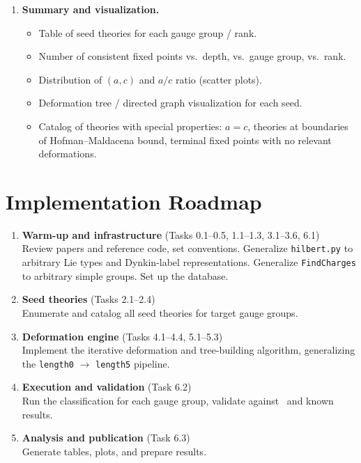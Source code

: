 \documentclass[12pt]{article}
\begin{document}
\begin{enumerate}[label=\textbf{6.\arabic*}]
\item \textbf{Summary and visualization.} \\
  \begin{itemize}
    \item Table of seed theories for each gauge group / rank.
    \item Number of consistent fixed points vs.\ depth, vs.\ gauge group, vs.\ rank.
    \item Distribution of $(a, c)$ and $a/c$ ratio (scatter plots).
    \item Deformation tree / directed graph visualization for each seed.
    \item Catalog of theories with special properties: $a = c$, theories at boundaries of Hofman--Maldacena bound, terminal fixed points with no relevant deformations.
  \end{itemize}

\end{enumerate}

\section{Implementation Roadmap}

\begin{enumerate}[label=\textbf{Phase \arabic*:}]

\item \textbf{Warm-up and infrastructure} (Tasks 0.1--0.5, 1.1--1.3, 3.1--3.6, 6.1) \\
  Review papers and reference code, set conventions.
  Generalize \texttt{hilbert.py} to arbitrary Lie types and Dynkin-label representations.
  Generalize \texttt{FindCharges} to arbitrary simple groups.
  Set up the database.

\item \textbf{Seed theories} (Tasks 2.1--2.4) \\
  Enumerate and catalog all seed theories for target gauge groups.

\item \textbf{Deformation engine} (Tasks 4.1--4.4, 5.1--5.3) \\
  Implement the iterative deformation and tree-building algorithm, generalizing the
  \texttt{length0} $\to$ \texttt{length5} pipeline.

\item \textbf{Execution and validation} (Task 6.2) \\
  Run the classification for each gauge group, validate against~\cite{CMNS} and known results.

\item \textbf{Analysis and publication} (Task 6.3) \\
  Generate tables, plots, and prepare results.

\end{enumerate}
\end{document}
